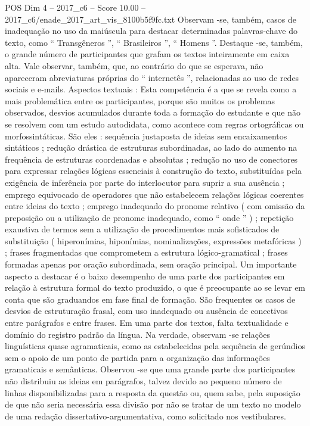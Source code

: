 \begin{textsample}{POS Dim 4 – 2017\_c6 – Score 10.00 – 2017\_c6/enade\_2017\_art\_vis\_8100b5f9fc.txt}
Observam -se, também, casos de inadequação no uso da maiúscula para destacar determinadas palavras-chave do texto, como “ Transgêneros ”, “ Brasileiros ”, “ Homens ”.
Destaque -se, também, o grande número de participantes que grafam os textos inteiramente em caixa alta.
Vale observar, também, que, ao contrário do que se esperava, não apareceram abreviaturas próprias do “ internetês ”, relacionadas ao uso de redes sociais e e-mails.
Aspectos textuais : Esta competência é a que se revela como a mais problemática entre os participantes, porque são muitos os problemas observados, desvios acumulados durante toda a formação do estudante e que não se resolvem com um estudo autodidata, como acontece com regras ortográficas ou morfossintáticas.
São eles : sequência justaposta de ideias sem encaixamentos sintáticos ; redução drástica de estruturas subordinadas, ao lado do aumento na frequência de estruturas coordenadas e absolutas ; redução no uso de conectores para expressar relações lógicas essenciais à construção do texto, substituídas pela exigência de inferência por parte do interlocutor para suprir a sua ausência ; emprego equivocado de operadores que não estabelecem relações lógicas coerentes entre ideias do texto ; emprego inadequado do pronome relativo ( com omissão da preposição ou a utilização de pronome inadequado, como “ onde ” ) ; repetição exaustiva de termos sem a utilização de procedimentos mais sofisticados de substituição ( hiperonímias, hiponímias, nominalizações, expressões metafóricas ) ; frases fragmentadas que comprometem a estrutura lógico-gramatical ; frases formadas apenas por oração subordinada, sem oração principal.
Um importante aspecto a destacar é o baixo desempenho de uma parte dos participantes em relação à estrutura formal do texto produzido, o que é preocupante ao se levar em conta que são graduandos em fase final de formação.
São frequentes os casos de desvios de estruturação frasal, com uso inadequado ou ausência de conectivos entre parágrafos e entre frases.
Em uma parte dos textos, falta textualidade e domínio do registro padrão da língua.
Na verdade, observam -se relações linguísticas quase agramaticais, como as estabelecidas pela sequência de gerúndios sem o apoio de um ponto de partida para a organização das informações gramaticais e semânticas.
Observou -se que uma grande parte dos participantes não distribuiu as ideias em parágrafos, talvez devido ao pequeno número de linhas disponibilizadas para a resposta da questão ou, quem sabe, pela suposição de que não seria necessária essa divisão por não se tratar de um texto no modelo de uma redação dissertativo-argumentativa, como solicitado nos vestibulares.

\end{textsample}
